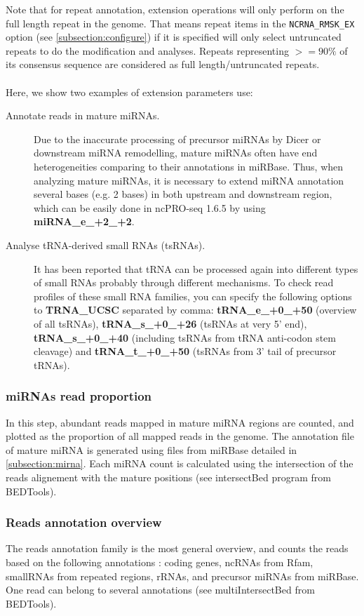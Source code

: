 \documentclass[12pt]{article}
\def \ncpip{ncPRO-seq 1.6.5}
\begin{document}
Note that for repeat annotation, extension operations will only perform on the full length repeat in the genome. That means repeat items in the \verb+NCRNA_RMSK_EX+ option (see \ref{subsection:configure}) if it is specified will only select untruncated repeats to do the modification and analyses. Repeats representing $>=90\%$ of its consensus sequence are considered as full length/untruncated repeats.\\\\
Here, we show two examples of extension parameters use:
\begin{description}
 \item[Annotate reads in mature miRNAs.] Due to the inaccurate processing of precursor miRNAs by Dicer or downstream miRNA remodelling, mature miRNAs often have end heterogeneities comparing to their annotations in miRBase. Thus, when analyzing mature miRNAs, it is necessary to extend miRNA annotation several bases (e.g. 2 bases) in both upstream and downstream region, which can be easily done in \ncpip{} by using \textbf{miRNA\_e\_+2\_+2}.
 \item[Analyse tRNA-derived small RNAs (tsRNAs).] It has been reported that tRNA can be processed again into different types of small RNAs probably through different mechanisms. To check read profiles of these small RNA families, you can specify the following options to \textbf{TRNA\_UCSC} separated by comma: \textbf{tRNA\_e\_+0\_+50} (overview of all tsRNAs), \textbf{tRNA\_s\_+0\_+26} (tsRNAs at very 5' end), \textbf{tRNA\_s\_+0\_+40} (including tsRNAs from tRNA anti-codon stem cleavage) and \textbf{tRNA\_t\_+0\_+50} (tsRNAs from 3' tail of precursor tRNAs).
 \end{description}

\subsubsection{miRNAs read proportion}
\label{subsubsection:mirnaread}
In this step, abundant reads mapped in mature miRNA regions are counted, and plotted as the proportion of all mapped reads in the genome. The annotation file of mature miRNA is generated using files from miRBase \cite{Kozomara2011} detailed in \ref{subsection:mirna}. Each miRNA count is calculated using the intersection of the reads alignement with the mature positions (see intersectBed program from BEDTools).

\subsubsection{Reads annotation overview}
The reads annotation family is the most general overview, and counts the reads based on the following annotations : coding genes, ncRNAs from Rfam, smallRNAs from repeated regions, rRNAs, and precursor miRNAs from miRBase. One read can belong to several annotations (see multiIntersectBed from BEDTools).
\end{document}
